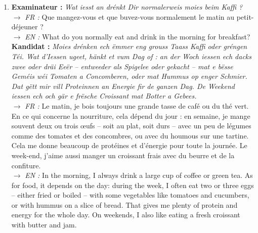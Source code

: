 \begin{enumerate}
    \item \textbf{Examinateur :} \textit{Wat iesst an drénkt Dir normalerweis moies beim Kaffi ?} \\
    $\rightarrow$ \textit{FR :} Que mangez-vous et que buvez-vous normalement le matin au petit-déjeuner ? \\
    $\rightarrow$ \textit{EN :} What do you normally eat and drink in the morning for breakfast? \\
    \textbf{Kandidat :} \textit{Moies drénken ech ëmmer eng grouss Taass Kaffi oder gréngen Téi. Wat d'Iessen ugeet, hänkt et vum Dag of : an der Woch iessen ech dacks zwee oder dräi Eeër -- entweeder als Spigelee oder gekacht -- mat e bësse Geméis wéi Tomaten a Concomberen, oder mat Hummus op enger Schmier. Dat gëtt mir vill Proteinnen an Energie fir de ganzen Dag. De Weekend iessen ech och gär e frësche Croissant mat Botter a Gebees.} \\
    $\rightarrow$ \textit{FR :} Le matin, je bois toujours une grande tasse de café ou du thé vert. En ce qui concerne la nourriture, cela dépend du jour : en semaine, je mange souvent deux ou trois œufs -- soit au plat, soit durs -- avec un peu de légumes comme des tomates et des concombres, ou avec du houmous sur une tartine. Cela me donne beaucoup de protéines et d'énergie pour toute la journée. Le week-end, j'aime aussi manger un croissant frais avec du beurre et de la confiture. \\
    $\rightarrow$ \textit{EN :} In the morning, I always drink a large cup of coffee or green tea. As for food, it depends on the day: during the week, I often eat two or three eggs -- either fried or boiled -- with some vegetables like tomatoes and cucumbers, or with hummus on a slice of bread. That gives me plenty of protein and energy for the whole day. On weekends, I also like eating a fresh croissant with butter and jam.

    \vspace{0.4em}


\end{enumerate}
